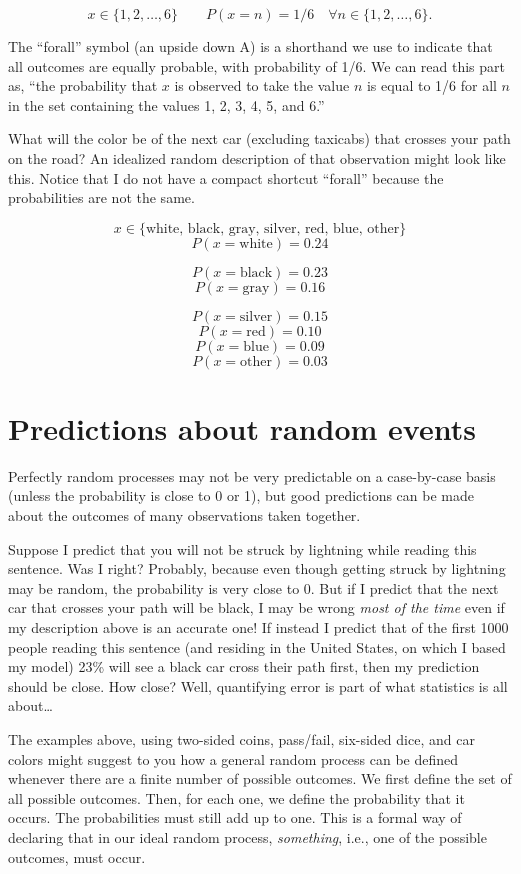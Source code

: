 \documentclass[openany]{book}
\begin{document}
\[ x \in \{1, 2, \dots, 6\} \qquad P(x=n) = 1/6 \quad \forall n \in \{1, 2, \dots, 6\}. \]

The ``forall'' symbol (an upside down A) is a shorthand we use to indicate that all outcomes are equally probable, with probability of 1/6. We can read this part as, ``the probability that \(x\) is observed to take the value \(n\) is equal to 1/6 for all \(n\) in the set containing the values 1, 2, 3, 4, 5, and 6.''

What will the color be of the next car (excluding taxicabs) that crosses your path on the road? An idealized random description of that observation might look like this. Notice that I do not have a compact shortcut ``forall'' because the probabilities are not the same.

\[ x \in \{\mbox{white, black, gray, silver, red, blue, other}\} \]
\[ P(x=\mbox{white}) = 0.24 \]

\[ P(x=\mbox{black}) = 0.23 \]
\[P(x=\mbox{gray}) = 0.16 \]

\[P(x=\mbox{silver}) = 0.15 \]
\[P(x=\mbox{red}) = 0.10 \]
\[P(x=\mbox{blue}) = 0.09 \]
\[P(x=\mbox{other}) = 0.03 \]

\hypertarget{predictions-about-random-events}{%
\section{Predictions about random events}\label{predictions-about-random-events}}

Perfectly random processes may not be very predictable on a case-by-case basis (unless the probability is close to 0 or 1), but good predictions can be made about the outcomes of many observations taken together.

Suppose I predict that you will not be struck by lightning while reading this sentence. Was I right? Probably, because even though getting struck by lightning may be random, the probability is very close to 0. But if I predict that the next car that crosses your path will be black, I may be wrong \emph{most of the time} even if my description above is an accurate one! If instead I predict that of the first 1000 people reading this sentence (and residing in the United States, on which I based my model) 23\% will see a black car cross their path first, then my prediction should be close. How close? Well, quantifying error is part of what statistics is all about\ldots{}

The examples above, using two-sided coins, pass/fail, six-sided dice, and car colors might suggest to you how a general random process can be defined whenever there are a finite number of possible outcomes. We first define the set of all possible outcomes. Then, for each one, we define the probability that it occurs. The probabilities must still add up to one. This is a formal way of declaring that in our ideal random process, \emph{something}, i.e., one of the possible outcomes, must occur.
\end{document}
